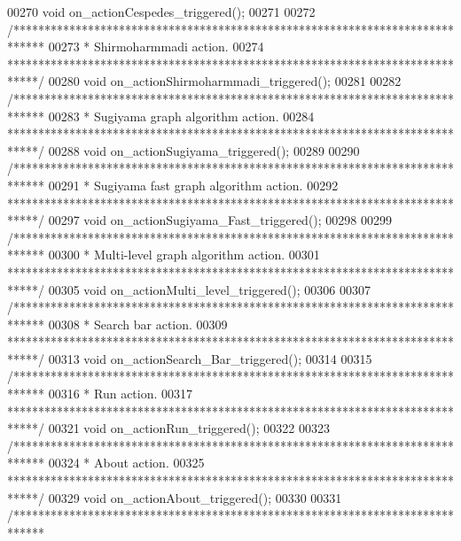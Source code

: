 \begin{DoxyCode}
00270   \textcolor{keywordtype}{void} on\_actionCespedes\_triggered();
00271 
00272   \textcolor{comment}{/*****************************************************************************}
00273 \textcolor{comment}{  * Shirmoharmmadi action.}
00274 \textcolor{comment}{  *****************************************************************************/}
00280   \textcolor{keywordtype}{void} on\_actionShirmoharmmadi\_triggered();
00281 
00282   \textcolor{comment}{/*****************************************************************************}
00283 \textcolor{comment}{  * Sugiyama graph algorithm action.}
00284 \textcolor{comment}{  *****************************************************************************/}
00288   \textcolor{keywordtype}{void} on\_actionSugiyama\_triggered();
00289 
00290   \textcolor{comment}{/*****************************************************************************}
00291 \textcolor{comment}{  * Sugiyama fast graph algorithm action.}
00292 \textcolor{comment}{  *****************************************************************************/}
00297   \textcolor{keywordtype}{void} on\_actionSugiyama\_Fast\_triggered();
00298 
00299   \textcolor{comment}{/*****************************************************************************}
00300 \textcolor{comment}{  * Multi-level graph algorithm action.}
00301 \textcolor{comment}{  *****************************************************************************/}
00305   \textcolor{keywordtype}{void} on\_actionMulti\_level\_triggered();
00306 
00307   \textcolor{comment}{/*****************************************************************************}
00308 \textcolor{comment}{  * Search bar action.}
00309 \textcolor{comment}{  *****************************************************************************/}
00313   \textcolor{keywordtype}{void} on\_actionSearch\_Bar\_triggered();
00314 
00315   \textcolor{comment}{/*****************************************************************************}
00316 \textcolor{comment}{  * Run action.}
00317 \textcolor{comment}{  *****************************************************************************/}
00321   \textcolor{keywordtype}{void} on\_actionRun\_triggered();
00322 
00323   \textcolor{comment}{/*****************************************************************************}
00324 \textcolor{comment}{  * About action.}
00325 \textcolor{comment}{  *****************************************************************************/}
00329   \textcolor{keywordtype}{void} on\_actionAbout\_triggered();
00330 
00331   \textcolor{comment}{/*****************************************************************************}

\end{DoxyCode}
